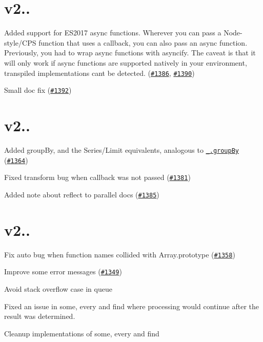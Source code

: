 \section*{v2..}


\begin{DoxyItemize}
\item Added support for E\+S2017 {\ttfamily async} functions. Wherever you can pass a Node-\/style/\+C\+PS function that uses a callback, you can also pass an {\ttfamily async} function. Previously, you had to wrap {\ttfamily async} functions with {\ttfamily asyncify}. The caveat is that it will only work if {\ttfamily async} functions are supported natively in your environment, transpiled implementations can\textquotesingle{}t be detected. (\href{https://github.com/caolan/async/issues/1386}{\tt \#1386}, \href{https://github.com/caolan/async/issues/1390}{\tt \#1390})
\item Small doc fix (\href{https://github.com/caolan/async/issues/1392}{\tt \#1392})
\end{DoxyItemize}

\section*{v2..}


\begin{DoxyItemize}
\item Added {\ttfamily group\+By}, and the {\ttfamily Series}/{\ttfamily Limit} equivalents, analogous to \href{http://lodash.com/docs#groupBy}{\tt {\ttfamily \+\_\+.\+group\+By}} (\href{https://github.com/caolan/async/issues/1364}{\tt \#1364})
\item Fixed {\ttfamily transform} bug when {\ttfamily callback} was not passed (\href{https://github.com/caolan/async/issues/1381}{\tt \#1381})
\item Added note about {\ttfamily reflect} to {\ttfamily parallel} docs (\href{https://github.com/caolan/async/issues/1385}{\tt \#1385})
\end{DoxyItemize}

\section*{v2..}


\begin{DoxyItemize}
\item Fix {\ttfamily auto} bug when function names collided with Array.\+prototype (\href{https://github.com/caolan/async/issues/1358}{\tt \#1358})
\item Improve some error messages (\href{https://github.com/caolan/async/issues/1349}{\tt \#1349})
\item Avoid stack overflow case in queue
\item Fixed an issue in {\ttfamily some}, {\ttfamily every} and {\ttfamily find} where processing would continue after the result was determined.
\item Cleanup implementations of {\ttfamily some}, {\ttfamily every} and {\ttfamily find}
\end{DoxyItemize}


